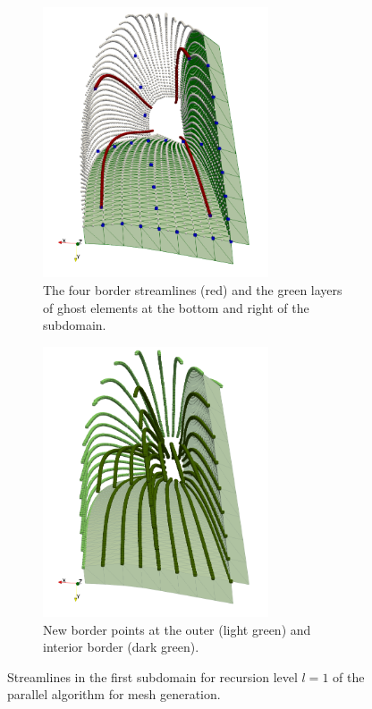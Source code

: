 \begin{figure}
\begin{subfigure}[t]{0.45\textwidth}
    \includegraphics[height=8cm]{images/parallel_fiber_estimation/05_corner_streamlines.png}
    \caption{The four border streamlines (red) and the green layers of ghost elements at the bottom and right of the subdomain.}%
    \label{fig:05_corner_streamlines}%
  \end{subfigure}   
  \quad
  \begin{subfigure}[t]{0.45\textwidth}%
    \centering%
    \includegraphics[height=8cm]{images/parallel_fiber_estimation/07_filled.png}
    \caption{New border points at the outer (light green) and interior border (dark green).}%
    \label{fig:07_filled}%
  \end{subfigure}  
  \caption{Streamlines in the first subdomain for recursion level $l=1$ of the parallel algorithm for mesh generation.}%
  \label{fig:03_border_points_and_seed_points}%
\end{figure}%

